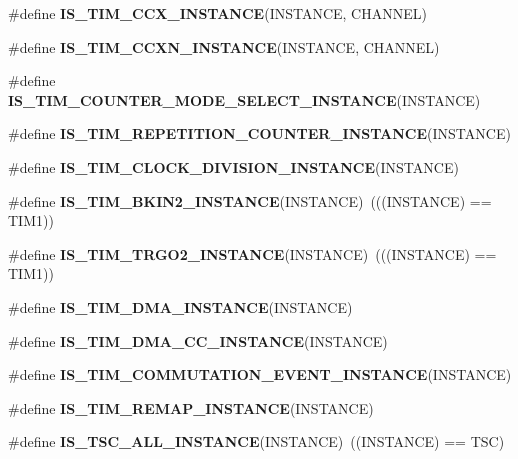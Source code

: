 \begin{DoxyCompactItemize}
\item 
\#define {\bfseries I\+S\+\_\+\+T\+I\+M\+\_\+\+C\+C\+X\+\_\+\+I\+N\+S\+T\+A\+N\+CE}(I\+N\+S\+T\+A\+N\+CE,  C\+H\+A\+N\+N\+EL)
\item 
\#define {\bfseries I\+S\+\_\+\+T\+I\+M\+\_\+\+C\+C\+X\+N\+\_\+\+I\+N\+S\+T\+A\+N\+CE}(I\+N\+S\+T\+A\+N\+CE,  C\+H\+A\+N\+N\+EL)
\item 
\#define {\bfseries I\+S\+\_\+\+T\+I\+M\+\_\+\+C\+O\+U\+N\+T\+E\+R\+\_\+\+M\+O\+D\+E\+\_\+\+S\+E\+L\+E\+C\+T\+\_\+\+I\+N\+S\+T\+A\+N\+CE}(I\+N\+S\+T\+A\+N\+CE)
\item 
\#define {\bfseries I\+S\+\_\+\+T\+I\+M\+\_\+\+R\+E\+P\+E\+T\+I\+T\+I\+O\+N\+\_\+\+C\+O\+U\+N\+T\+E\+R\+\_\+\+I\+N\+S\+T\+A\+N\+CE}(I\+N\+S\+T\+A\+N\+CE)
\item 
\#define {\bfseries I\+S\+\_\+\+T\+I\+M\+\_\+\+C\+L\+O\+C\+K\+\_\+\+D\+I\+V\+I\+S\+I\+O\+N\+\_\+\+I\+N\+S\+T\+A\+N\+CE}(I\+N\+S\+T\+A\+N\+CE)
\item 
\mbox{\label{group___exported__macro_ga64ee0eb39ee44221618c397a8f74c7b8}} 
\#define {\bfseries I\+S\+\_\+\+T\+I\+M\+\_\+\+B\+K\+I\+N2\+\_\+\+I\+N\+S\+T\+A\+N\+CE}(I\+N\+S\+T\+A\+N\+CE)~(((I\+N\+S\+T\+A\+N\+CE) == T\+I\+M1))
\item 
\mbox{\label{group___exported__macro_ga68305c0173caf4e109020403624d252f}} 
\#define {\bfseries I\+S\+\_\+\+T\+I\+M\+\_\+\+T\+R\+G\+O2\+\_\+\+I\+N\+S\+T\+A\+N\+CE}(I\+N\+S\+T\+A\+N\+CE)~(((I\+N\+S\+T\+A\+N\+CE) == T\+I\+M1))
\item 
\#define {\bfseries I\+S\+\_\+\+T\+I\+M\+\_\+\+D\+M\+A\+\_\+\+I\+N\+S\+T\+A\+N\+CE}(I\+N\+S\+T\+A\+N\+CE)
\item 
\#define {\bfseries I\+S\+\_\+\+T\+I\+M\+\_\+\+D\+M\+A\+\_\+\+C\+C\+\_\+\+I\+N\+S\+T\+A\+N\+CE}(I\+N\+S\+T\+A\+N\+CE)
\item 
\#define {\bfseries I\+S\+\_\+\+T\+I\+M\+\_\+\+C\+O\+M\+M\+U\+T\+A\+T\+I\+O\+N\+\_\+\+E\+V\+E\+N\+T\+\_\+\+I\+N\+S\+T\+A\+N\+CE}(I\+N\+S\+T\+A\+N\+CE)
\item 
\#define {\bfseries I\+S\+\_\+\+T\+I\+M\+\_\+\+R\+E\+M\+A\+P\+\_\+\+I\+N\+S\+T\+A\+N\+CE}(I\+N\+S\+T\+A\+N\+CE)
\item 
\mbox{\label{group___exported__macro_gaf29af2609f6b7748104a965262e95475}} 
\#define {\bfseries I\+S\+\_\+\+T\+S\+C\+\_\+\+A\+L\+L\+\_\+\+I\+N\+S\+T\+A\+N\+CE}(I\+N\+S\+T\+A\+N\+CE)~((I\+N\+S\+T\+A\+N\+CE) == T\+SC)

\end{DoxyCompactItemize}
